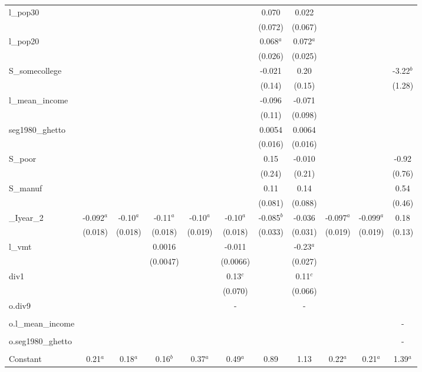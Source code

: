 \documentclass[]{article}
\begin{document}
\begin{tabular}{lcccccccccc}
l\_pop30 &  &  &  &  &  & 0.070 & 0.022 &  &  &  \\
 &  &  &  &  &  & (0.072) & (0.067) &  &  &  \\
l\_pop20 &  &  &  &  &  & 0.068$^a$ & 0.072$^a$ &  &  &  \\
 &  &  &  &  &  & (0.026) & (0.025) &  &  &  \\
S\_somecollege &  &  &  &  &  & -0.021 & 0.20 &  &  & -3.22$^b$ \\
 &  &  &  &  &  & (0.14) & (0.15) &  &  & (1.28) \\
l\_mean\_income &  &  &  &  &  & -0.096 & -0.071 &  &  &  \\
 &  &  &  &  &  & (0.11) & (0.098) &  &  &  \\
seg1980\_ghetto &  &  &  &  &  & 0.0054 & 0.0064 &  &  &  \\
 &  &  &  &  &  & (0.016) & (0.016) &  &  &  \\
S\_poor &  &  &  &  &  & 0.15 & -0.010 &  &  & -0.92 \\
 &  &  &  &  &  & (0.24) & (0.21) &  &  & (0.76) \\
S\_manuf &  &  &  &  &  & 0.11 & 0.14 &  &  & 0.54 \\
 &  &  &  &  &  & (0.081) & (0.088) &  &  & (0.46) \\
\_Iyear\_2 & -0.092$^a$ & -0.10$^a$ & -0.11$^a$ & -0.10$^a$ & -0.10$^a$ & -0.085$^b$ & -0.036 & -0.097$^a$ & -0.099$^a$ & 0.18 \\
 & (0.018) & (0.018) & (0.018) & (0.019) & (0.018) & (0.033) & (0.031) & (0.019) & (0.019) & (0.13) \\
l\_vmt &  &  & 0.0016 &  & -0.011 &  & -0.23$^a$ &  &  &  \\
 &  &  & (0.0047) &  & (0.0066) &  & (0.027) &  &  &  \\
div1 &  &  &  &  & 0.13$^c$ &  & 0.11$^c$ &  &  &  \\
 &  &  &  &  & (0.070) &  & (0.066) &  &  &  \\
o.div9 &  &  &  &  & - &  & - &  &  &  \\
 &  &  &  &  &  &  &  &  &  &  \\
o.l\_mean\_income &  &  &  &  &  &  &  &  &  & - \\
 &  &  &  &  &  &  &  &  &  &  \\
o.seg1980\_ghetto &  &  &  &  &  &  &  &  &  & - \\
 &  &  &  &  &  &  &  &  &  &  \\
Constant & 0.21$^a$ & 0.18$^a$ & 0.16$^b$ & 0.37$^a$ & 0.49$^a$ & 0.89 & 1.13 & 0.22$^a$ & 0.21$^a$ & 1.39$^a$ \\

\end{tabular}
\end{document}
